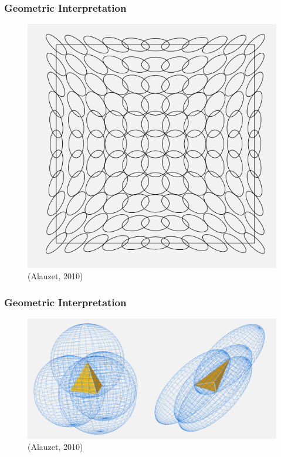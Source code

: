 \documentclass{beamer}
\begin{document}
  \begin{frame}
	\frametitle{Geometric Interpretation}
	\begin{figure}
		\includegraphics[width=.65\textwidth]{Figures/Ellipses.png}
		\caption{(Alauzet, 2010)}
	\end{figure}
  \end{frame}

  \begin{frame}
	\frametitle{Geometric Interpretation}
	\begin{figure}
		\includegraphics[width=.80\textwidth]{Figures/Tetra.png}
		\caption{(Alauzet, 2010)}
	\end{figure}
  \end{frame}
\end{document}
